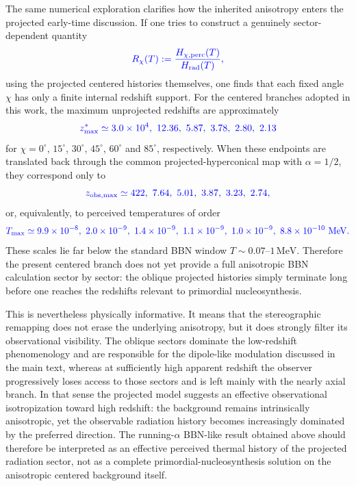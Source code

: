 \documentclass[11pt]{article}
\newcommand{\blue}[1]{{\color{blue}#1}}
\begin{document}
\blue{The same numerical exploration clarifies how the inherited anisotropy enters the projected early-time discussion. If one tries to construct a genuinely sector-dependent quantity}
\begin{equation}
\blue{
R_\chi(T):=\frac{H_{\chi,\mathrm{perc}}(T)}{H_{\mathrm{rad}}(T)},
}
\end{equation}
\blue{using the projected centered histories themselves, one finds that each fixed angle $\chi$ has only a finite internal redshift support. For the centered branches adopted in this work, the maximum unprojected redshifts are approximately}
\begin{equation}
\blue{
z^*_{\max}\simeq 3.0\times10^4,\ 12.36,\ 5.87,\ 3.78,\ 2.80,\ 2.13
}
\end{equation}
\blue{for $\chi=0^\circ$, $15^\circ$, $30^\circ$, $45^\circ$, $60^\circ$ and $85^\circ$, respectively. When these endpoints are translated back through the common projected-hyperconical map with $\alpha=1/2$, they correspond only to}
\begin{equation}
\blue{
z_{\mathrm{obs},\max}\simeq 422,\ 7.64,\ 5.01,\ 3.87,\ 3.23,\ 2.74,
}
\end{equation}
\blue{or, equivalently, to perceived temperatures of order}
\begin{equation}
\blue{
T_{\max}\simeq 9.9\times10^{-8},\ 2.0\times10^{-9},\ 1.4\times10^{-9},\ 1.1\times10^{-9},\ 1.0\times10^{-9},\ 8.8\times10^{-10}\ \mathrm{MeV}.
}
\end{equation}
\blue{These scales lie far below the standard BBN window $T\sim0.07$--$1\,\mathrm{MeV}$. Therefore the present centered branch does not yet provide a full anisotropic BBN calculation sector by sector: the oblique projected histories simply terminate long before one reaches the redshifts relevant to primordial nucleosynthesis.}

\blue{This is nevertheless physically informative. It means that the stereographic remapping does not erase the underlying anisotropy, but it does strongly filter its observational visibility. The oblique sectors dominate the low-redshift phenomenology and are responsible for the dipole-like modulation discussed in the main text, whereas at sufficiently high apparent redshift the observer progressively loses access to those sectors and is left mainly with the nearly axial branch. In that sense the projected model suggests an effective observational isotropization toward high redshift: the background remains intrinsically anisotropic, yet the observable radiation history becomes increasingly dominated by the preferred direction. The running-$\alpha$ BBN-like result obtained above should therefore be interpreted as an effective perceived thermal history of the projected radiation sector, not as a complete primordial-nucleosynthesis solution on the anisotropic centered background itself.}
\end{document}
